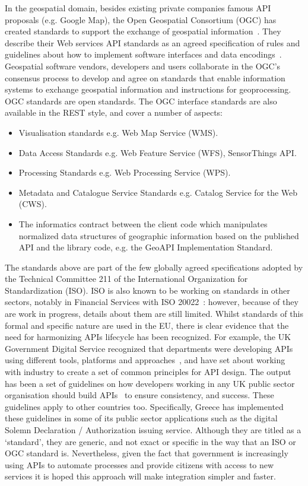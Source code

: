 In the geospatial domain, besides existing private companies famous API proposals
(e.g. Google Map), the Open Geospatial Consortium (OGC) has created standards to
support the exchange of geospatial information~\citep{opengeospatial}. They describe their Web services
API standards as an agreed specification of rules and guidelines about how to
implement software interfaces and data encodings~\citep{opengeospatial_elearning}. Geospatial software vendors,
developers and users collaborate in the OGC’s consensus process to develop and
agree on standards that enable information systems to exchange geospatial
information and instructions for geoprocessing. OGC standards are open standards.
The OGC interface standards are also available in the REST style, and cover a
number of aspects:
\begin{itemize}
	\item Visualisation standards e.g. Web Map Service (WMS).
	\item Data Access Standards e.g. Web Feature Service (WFS), SensorThings API.
	\item Processing Standards e.g. Web Processing Service (WPS).
	\item Metadata and Catalogue Service Standards e.g. Catalog Service for the Web (CWS).
	\item The informatics contract between the client code which manipulates normalized
	data structures of geographic information based on the published API and the library
	code, e.g. the GeoAPI Implementation Standard.
\end{itemize}

The standards above are part of the few globally agreed specifications adopted by
the Technical Committee 211 of the International Organization for Standardization
(ISO). ISO is also known to be working on standards in other sectors, notably in
Financial Services with ISO 20022~\citep{iso}: however, because of they are work in
progress,
details about them are still limited. Whilst standards of this formal and specific
nature are used in the EU, there is clear evidence that the need for harmonizing
APIs lifecycle has been recognized. For example, the UK Government Digital Service
recognized that departments were developing APIs using different tools, platforms
and approaches~\citep{tech_gov}, and have set about working with industry to create a set of
common principles for API design. The output has been a set of guidelines on how
developers working in any UK public sector organisation should build APIs~\citep{gov_uk_api} to
ensure consistency, and success. These guidelines apply to other countries too. Specifically,
Greece has implemented these guidelines in some of its public sector applications such as the digital
Solemn Declaration / Authorization issuing service.
Although they are titled as a ‘standard’, they
are generic, and not exact or specific in the way that an ISO or OGC standard is.
Nevertheless, given the fact that government is increasingly using APIs to
automate processes and provide citizens with access to new services it is hoped
this approach will make integration simpler and faster.